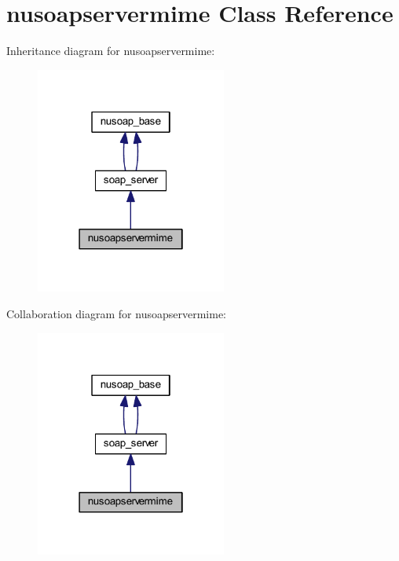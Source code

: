 \hypertarget{classnusoapservermime}{\section{nusoapservermime Class Reference}
\label{classnusoapservermime}
}


Inheritance diagram for nusoapservermime\-:
\nopagebreak
\begin{figure}[H]
\begin{center}
\leavevmode
\includegraphics[width=178pt]{classnusoapservermime__inherit__graph}
\end{center}
\end{figure}


Collaboration diagram for nusoapservermime\-:
\nopagebreak
\begin{figure}[H]
\begin{center}
\leavevmode
\includegraphics[width=178pt]{classnusoapservermime__coll__graph}
\end{center}
\end{figure}
